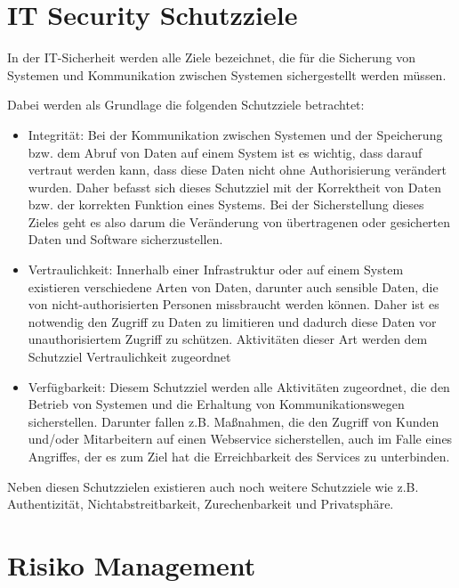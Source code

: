 \section{IT Security Schutzziele}
\label{cha:IT Security Schutzziele}

In der IT-Sicherheit werden alle Ziele bezeichnet, die für die Sicherung von Systemen und Kommunikation zwischen Systemen sichergestellt werden müssen. 

Dabei werden als Grundlage die folgenden Schutzziele betrachtet:
\begin{itemize}
\item Integrität: Bei der Kommunikation zwischen Systemen und der Speicherung bzw. dem Abruf von Daten auf einem System ist es wichtig, dass darauf vertraut werden kann, dass diese Daten nicht ohne Authorisierung verändert wurden. Daher befasst sich dieses Schutzziel mit der Korrektheit von Daten bzw. der korrekten Funktion eines Systems. Bei der Sicherstellung dieses Zieles geht es also darum die Veränderung von übertragenen oder gesicherten Daten und Software sicherzustellen.
\item Vertraulichkeit: Innerhalb einer Infrastruktur oder auf einem System existieren verschiedene Arten von Daten, darunter auch sensible Daten,  die von nicht-authorisierten Personen missbraucht werden können. Daher ist es notwendig den Zugriff zu Daten zu limitieren und dadurch diese Daten vor unauthorisiertem Zugriff zu schützen. Aktivitäten dieser Art werden dem Schutzziel Vertraulichkeit zugeordnet
\item Verfügbarkeit: Diesem Schutzziel werden alle Aktivitäten zugeordnet, die den Betrieb von Systemen und die Erhaltung von Kommunikationswegen sicherstellen. Darunter fallen z.B. Maßnahmen, die den Zugriff von Kunden und/oder Mitarbeitern auf einen Webservice sicherstellen, auch im Falle eines Angriffes, der es zum Ziel hat die Erreichbarkeit des Services zu unterbinden.
\end{itemize}
Neben diesen Schutzzielen existieren auch noch weitere Schutzziele wie z.B. Authentizität, Nichtabstreitbarkeit, Zurechenbarkeit und Privatsphäre.

\section{Risiko Management}

